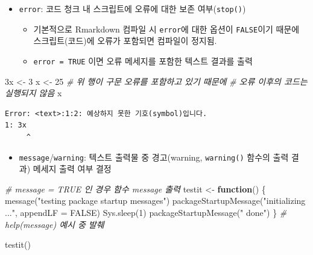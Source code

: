 \documentclass[
  11pt,
]{krantz}
\newenvironment{Shaded}{\begin{snugshade}}{\end{snugshade}}
\newcommand{\AttributeTok}[1]{\textcolor[rgb]{0.61,0.61,0.61}{#1}}
\newcommand{\CommentTok}[1]{\textcolor[rgb]{0.37,0.37,0.37}{\textit{#1}}}
\newcommand{\ConstantTok}[1]{\textcolor[rgb]{0,0,0}{#1}}
\newcommand{\ControlFlowTok}[1]{\textcolor[rgb]{0.27,0.27,0.27}{\textbf{#1}}}
\newcommand{\DecValTok}[1]{\textcolor[rgb]{0.06,0.06,0.06}{#1}}
\newcommand{\FunctionTok}[1]{\textcolor[rgb]{0,0,0}{#1}}
\newcommand{\NormalTok}[1]{#1}
\newcommand{\OtherTok}[1]{\textcolor[rgb]{0.37,0.37,0.37}{#1}}
\newcommand{\StringTok}[1]{\textcolor[rgb]{0.5,0.5,0.5}{#1}}
\providecommand{\tightlist}{%
  \setlength{\itemsep}{0pt}\setlength{\parskip}{0pt}}
\begin{document}
\normalsize

\begin{itemize}
\tightlist
\item
  \texttt{error}: 코드 청크 내 스크립트에 오류에 대한 보존 여부(\texttt{stop()})

  \begin{itemize}
  \tightlist
  \item
    기본적으로 Rmarkdown 컴파일 시 \texttt{error}에 대한 옵션이 \texttt{FALSE}이기 때문에 스크립트(코드)에 오류가 포함되면 컴파일이 정지됨.
  \item
    \texttt{error\ =\ TRUE} 이면 오류 메세지를 포함한 텍스트 결과를 출력
  \end{itemize}
\end{itemize}

\footnotesize

\begin{Shaded}
\begin{Highlighting}[]
\NormalTok{3x }\OtherTok{\textless{}{-}} \DecValTok{3}
\NormalTok{x }\OtherTok{\textless{}{-}} \DecValTok{25} \CommentTok{\# 위 행이 구문 오류를 포함하고 있기 때문에}
        \CommentTok{\# 오류 이후의 코드는 실행되지 않음}
\NormalTok{x}
\end{Highlighting}
\end{Shaded}

\begin{verbatim}
Error: <text>:1:2: 예상하지 못한 기호(symbol)입니다.
1: 3x
     ^
\end{verbatim}

\normalsize

\begin{itemize}
\tightlist
\item
  \texttt{message}/\texttt{warning}: 텍스트 출력물 중 경고(warning, \texttt{warning()} 함수의 출력 결과) 메세지 출력 여부 결정
\end{itemize}

\footnotesize

\begin{Shaded}
\begin{Highlighting}[]
\CommentTok{\# message = TRUE 인 경우 함수 message 출력}
\NormalTok{testit }\OtherTok{\textless{}{-}} \ControlFlowTok{function}\NormalTok{() \{}
  \FunctionTok{message}\NormalTok{(}\StringTok{"testing package startup messages"}\NormalTok{)}
  \FunctionTok{packageStartupMessage}\NormalTok{(}\StringTok{"initializing ..."}\NormalTok{, }\AttributeTok{appendLF =} \ConstantTok{FALSE}\NormalTok{)}
  \FunctionTok{Sys.sleep}\NormalTok{(}\DecValTok{1}\NormalTok{)}
  \FunctionTok{packageStartupMessage}\NormalTok{(}\StringTok{" done"}\NormalTok{)}
\NormalTok{\} }\CommentTok{\# help(message) 예시 중 발췌}

\FunctionTok{testit}\NormalTok{()}
\end{Highlighting}
\end{Shaded}
\end{document}
